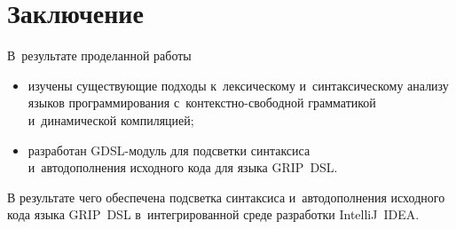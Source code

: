 \chapter*{Заключение}                       %


В~результате проделанной работы 

\begin{itemize} 
	\item{изучены существующие подходы к~лексическому и~синтаксическому анализу языков программирования с~контекстно-свободной грамматикой и~динамической компиляцией;}	
	\item{разработан GDSL-модуль для подсветки синтаксиса \\ и~автодополнения исходного кода для языка GRIP~DSL.}
\end{itemize} 

В результате чего обеспечена подсветка синтаксиса и~автодополнения исходного кода языка GRIP~DSL в~интегрированной среде разработки IntelliJ~IDEA.
